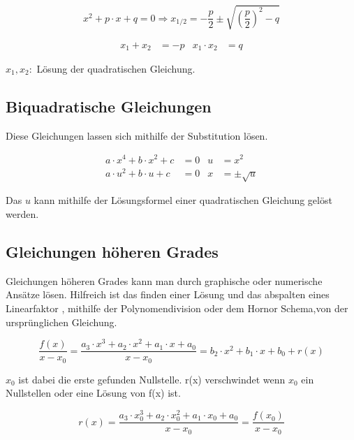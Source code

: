 \begin{shaded}
 \begin{equation}
  x^2+p\cdot x+q=0\Rightarrow x_{1/2}=-\frac{p}{2}\pm\sqrt{\left(\frac{p}{2}\right)^2-q}
 \end{equation}
\end{shaded}

\begin{shaded}
 \begin{align}
  x_1+x_2&=-p& x_1\cdot x_2&=q 
 \end{align}
\end{shaded}
$x_1, x_2:$ Lösung der quadratischen Gleichung.

\subsection{Biquadratische Gleichungen}
Diese Gleichungen lassen sich mithilfe der Substitution lösen.
\begin{shaded}
 \begin{align}
  a\cdot x^4+b\cdot x^2 +c&=0&u&=x^2 \\
  a\cdot u^2+b\cdot u +c&=0&x&=\pm\sqrt{u}
 \end{align}
\end{shaded}
Das $u$ kann mithilfe der Lösungsformel einer quadratischen Gleichung gelöst werden.

\subsection{Gleichungen höheren Grades} 
Gleichungen höheren Grades kann man durch graphische oder numerische Ansätze lösen. Hilfreich ist das finden einer Lösung und das abspalten eines Linearfaktor
, mithilfe der Polynomendivision oder dem Hornor Schema,von der ursprünglichen Gleichung.

\begin{shaded}
 \begin{equation}
  \frac{f(x)}{x-x_0}=\frac{a_3\cdot x^3+a_2\cdot x^2+a_1\cdot x +a_0}{x-x_0}=b_2\cdot x^2+b_1 \cdot x+b_0+r(x)
 \end{equation}
\end{shaded}
$x_0$ ist dabei die erste gefunden Nullstelle. r(x) verschwindet wenn $x_0$ ein Nullstellen oder eine Lösung von f(x) ist.
\begin{shaded}
 \begin{equation}
  r(x)=\frac{a_3\cdot x_0^3+a_2\cdot x_0^2+a_1\cdot x_0 +a_0}{x-x_0}=\frac{f(x_0)}{x-x_0}
 \end{equation}
\end{shaded}

